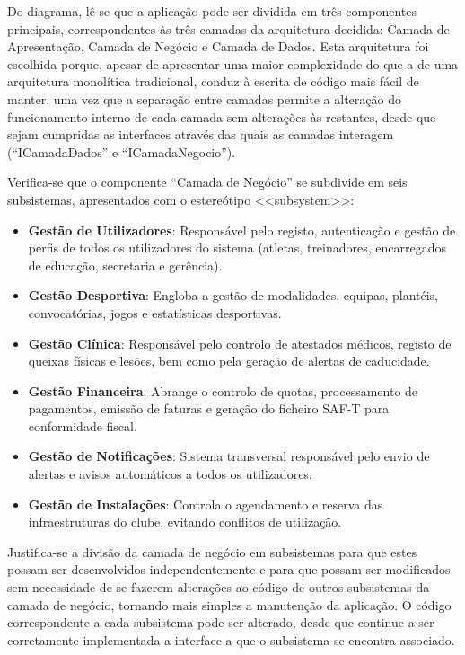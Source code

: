 \documentclass[a4paper,12pt]{scrreprt}
\begin{document}
{Do diagrama, lê-se que a aplicação pode ser dividida em três componentes principais, correspondentes às três camadas da arquitetura decidida: Camada de Apresentação, Camada de Negócio e Camada de Dados. Esta arquitetura foi escolhida porque, apesar de apresentar uma maior complexidade do que a de uma arquitetura monolítica tradicional, conduz à escrita de código mais fácil de manter, uma vez que a separação entre camadas permite a alteração do funcionamento interno de cada camada sem alterações às restantes, desde que sejam cumpridas as interfaces através das quais as camadas interagem (``ICamadaDados'' e ``ICamadaNegocio'').

Verifica-se que o componente ``Camada de Negócio'' se subdivide em seis subsistemas, apresentados com o estereótipo <<subsystem>>:

\begin{itemize}
    \item \textbf{Gestão de Utilizadores}: Responsável pelo registo, autenticação e gestão de perfis de todos os utilizadores do sistema (atletas, treinadores, encarregados de educação, secretaria e gerência).

    \item \textbf{Gestão Desportiva}: Engloba a gestão de modalidades, equipas, plantéis, convocatórias, jogos e estatísticas desportivas.

    \item \textbf{Gestão Clínica}: Responsável pelo controlo de atestados médicos, registo de queixas físicas e lesões, bem como pela geração de alertas de caducidade.

    \item \textbf{Gestão Financeira}: Abrange o controlo de quotas, processamento de pagamentos, emissão de faturas e geração do ficheiro SAF-T para conformidade fiscal.

    \item \textbf{Gestão de Notificações}: Sistema transversal responsável pelo envio de alertas e avisos automáticos a todos os utilizadores.

    \item \textbf{Gestão de Instalações}: Controla o agendamento e reserva das infraestruturas do clube, evitando conflitos de utilização.
\end{itemize}

Justifica-se a divisão da camada de negócio em subsistemas para que estes possam ser desenvolvidos independentemente e para que possam ser modificados sem necessidade de se fazerem alterações ao código de outros subsistemas da camada de negócio, tornando mais simples a manutenção da aplicação. O código correspondente a cada subsistema pode ser alterado, desde que continue a ser corretamente implementada a interface a que o subsistema se encontra associado.

}
\end{document}
